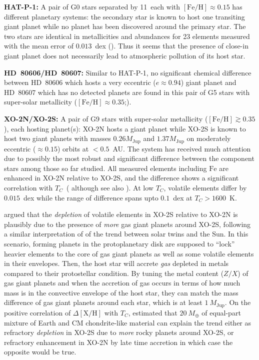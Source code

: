 \documentclass[modern, letterpaper]{aastex61}
\newcommand*\elem[1]{\ensuremath{\mathrm{#1}}}
\newcommand*\elemH[1]{\ensuremath{[\mathrm{#1}/\elem{H}]}}
\newcommand*{\feh}{\ensuremath{\elemH{Fe}}}
\newcommand{\Tcondens}{\ensuremath{T_C}}
\newcommand{\mearth}{\ensuremath{M_\oplus}}
\newcommand{\mjupiter}{\ensuremath{M_\mathrm{Jup}}}
\begin{document}
{\bf HAT-P-1:}
A pair of G0 stars separated by 11\arcsec\ each with $\feh\approx0.15$ has
different planetary systems:
the secondary star is known to host one transiting giant planet
while no planet has been discovered around the primary star.
The two stars are identical
in metallicities and abundances for 23 elements measured with
the mean error of $0.013$~dex (\citealt{Liu:2014aa}).
Thus it seems that the presence of close-in giant planet does not necessarily
lead to atmospheric pollution of its host star.

{\bf HD~80606/HD~80607:}
Similar to HAT-P-1, no significant chemical difference between HD~80606 which
hosts a very eccentric ($e\approx0.94$) giant planet and HD~80607 which has no
detected planets are found in this pair of G5 stars with super-solar
metallicity ($\feh \approx 0.35$;\citealt{Saffe:2015aa,Mack:2016aa}).

{\bf XO-2N/XO-2S:}
A pair of G9 stars with super-solar metallicity ($\feh \gtrsim 0.35$),
each hosting planet(s):
XO-2N hosts a giant planet while XO-2S is known to host two giant planets with
masses $0.26 \mjupiter$ and $1.37 \mjupiter$ on moderately eccentric ($\approx
0.15$) orbits at $<0.5$~AU.
The system has received much attention due to
possibly the most robust and significant difference between the component stars
among those so far studied.
All measured elements including \elem{Fe} are enhanced in XO-2N relative to
XO-2S, and the difference shows a significant correlation with \Tcondens\
(\citealt{Teske:2015aa,Ramirez:2015aa,Biazzo:2015aa} although see also
\citealt{Teske:2013aa}).
At low \Tcondens, volatile elements differ by $0.015$~dex while the range of
difference spans upto $0.1$~dex at $\Tcondens>1600$~K.

\citealt{Ramirez:2015aa} argued that the {\it depletion} of volatile elements
in XO-2S relative to XO-2N is plausibly due to the presence of {\it more} gas
giant planets around XO-2S, following a similar interpretation of
\citealt{Melendez:2009aa} of the trend between solar twins and the Sun.
In this scenario, forming planets in the protoplanetary disk are supposed to
``lock'' heavier elements to the core of gas giant planets as well as some
volatile elements in their envelopes. Then, the host star will accrete {\it
  gas} depleted in metals compared to their protostellar condition.
By tuning the metal content ($Z/X$) of gas giant planets and when the accretion
of gas occurs in terms of how much mass is in the convective envelope of the
host star, they can match the mass difference of gas giant planets around each
star, which is at least $1~\mjupiter$.
On the positive correlation of $\Delta\elemH{X}$ with \Tcondens,
\citealt{Ramirez:2015aa} estimated that $20~\mearth$ of equal-part mixture of
Earth and CM chondrite-like material can explain the trend either as refractory
{\it depletion} in XO-2S due to {\it more} rocky planets around XO-2S, or
refractory enhancement in XO-2N by late time accretion in which case the
opposite would be true.
\end{document}

